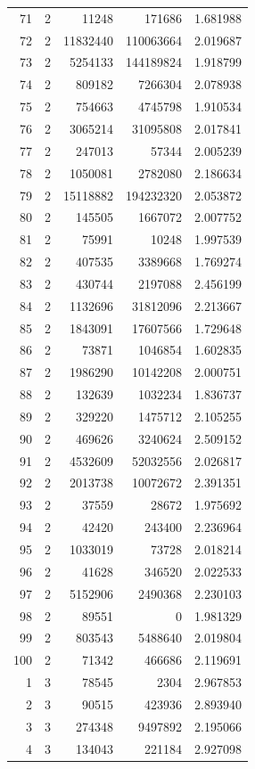 \begin{longtable}{rrrrr}
71 & 2 & 11248 & 171686 & 1.681988\\
72 & 2 & 11832440 & 110063664 & 2.019687\\
73 & 2 & 5254133 & 144189824 & 1.918799\\
74 & 2 & 809182 & 7266304 & 2.078938\\
75 & 2 & 754663 & 4745798 & 1.910534\\
76 & 2 & 3065214 & 31095808 & 2.017841\\
77 & 2 & 247013 & 57344 & 2.005239\\
78 & 2 & 1050081 & 2782080 & 2.186634\\
79 & 2 & 15118882 & 194232320 & 2.053872\\
80 & 2 & 145505 & 1667072 & 2.007752\\
81 & 2 & 75991 & 10248 & 1.997539\\
82 & 2 & 407535 & 3389668 & 1.769274\\
83 & 2 & 430744 & 2197088 & 2.456199\\
84 & 2 & 1132696 & 31812096 & 2.213667\\
85 & 2 & 1843091 & 17607566 & 1.729648\\
86 & 2 & 73871 & 1046854 & 1.602835\\
87 & 2 & 1986290 & 10142208 & 2.000751\\
88 & 2 & 132639 & 1032234 & 1.836737\\
89 & 2 & 329220 & 1475712 & 2.105255\\
90 & 2 & 469626 & 3240624 & 2.509152\\
91 & 2 & 4532609 & 52032556 & 2.026817\\
92 & 2 & 2013738 & 10072672 & 2.391351\\
93 & 2 & 37559 & 28672 & 1.975692\\
94 & 2 & 42420 & 243400 & 2.236964\\
95 & 2 & 1033019 & 73728 & 2.018214\\
96 & 2 & 41628 & 346520 & 2.022533\\
97 & 2 & 5152906 & 2490368 & 2.230103\\
98 & 2 & 89551 & 0 & 1.981329\\
99 & 2 & 803543 & 5488640 & 2.019804\\
100 & 2 & 71342 & 466686 & 2.119691\\
1 & 3 & 78545 & 2304 & 2.967853\\
2 & 3 & 90515 & 423936 & 2.893940\\
3 & 3 & 274348 & 9497892 & 2.195066\\
4 & 3 & 134043 & 221184 & 2.927098\\

\end{longtable}
